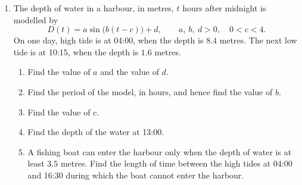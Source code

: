 \documentclass[12pt, twoside]{article}
\begin{document}
\begin{enumerate}[itemsep=0.15cm]

\newpage

\item[2.]

The depth of water in a harbour, in metres, $t$ hours after midnight is
modelled by
\[
D(t) = a\sin\bigl(b(t - c)\bigr) + d, \qquad a,\ b,\ d > 0, \quad
0 < c < 4.
\]
On one day, high tide is at 04:00, when the depth is $8.4$ metres. The next
low tide is at 10:15, when the depth is $1.6$ metres.

\begin{enumerate}[itemsep=0.1cm]
  \item Find the value of $a$ and the value of $d$.
  \item Find the period of the model, in hours, and hence find the value
  of $b$.
  \item Find the value of $c$.
  \item Find the depth of the water at 13:00.
  \item A fishing boat can enter the harbour only when the depth of water is
  at least $3.5$ metres. Find the length of time between the high tides at
  04:00 and 16:30 during which the boat cannot enter the harbour.
\end{enumerate}


\end{enumerate}
\end{document}
